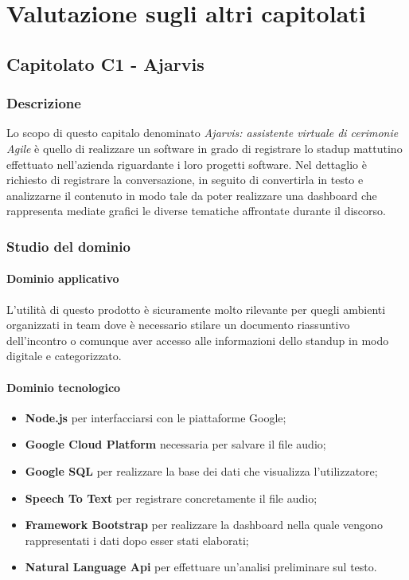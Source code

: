 \section{Valutazione sugli altri capitolati}
	\subsection{Capitolato C1 - Ajarvis}
		\subsubsection{Descrizione}
	    Lo scopo di questo capitalo denominato \emph{Ajarvis: assistente virtuale di cerimonie Agile} è quello di realizzare un software in grado di registrare lo stadup mattutino effettuato nell'azienda riguardante i loro progetti software. Nel dettaglio è richiesto di registrare la conversazione, in seguito di convertirla in testo e analizzarne il contenuto in modo tale da poter realizzare una dashboard che rappresenta mediate grafici le diverse tematiche affrontate durante il discorso.  
		\subsubsection{Studio del dominio}
			\paragraph{Dominio applicativo} \Spazio
			 L'utilità di questo prodotto è sicuramente molto rilevante per quegli ambienti organizzati in team dove è necessario stilare un documento riassuntivo dell'incontro o comunque aver accesso alle informazioni dello standup in modo digitale e categorizzato.
			\paragraph{Dominio tecnologico}
			\begin{itemize}
				\item \textbf{Node.js} per interfacciarsi con le piattaforme Google;
				\item  \textbf{Google Cloud Platform} necessaria per salvare il file audio; 
				\item  \textbf{Google SQL} per realizzare la base dei dati che visualizza l'utilizzatore;
				\item  \textbf{Speech To Text} per registrare concretamente il file audio;
				\item  \textbf{Framework Bootstrap} per realizzare la dashboard nella quale vengono rappresentati i dati dopo esser stati elaborati;
				\item  \textbf{Natural Language Api} per effettuare un'analisi preliminare sul testo.	
			\end{itemize}
			
